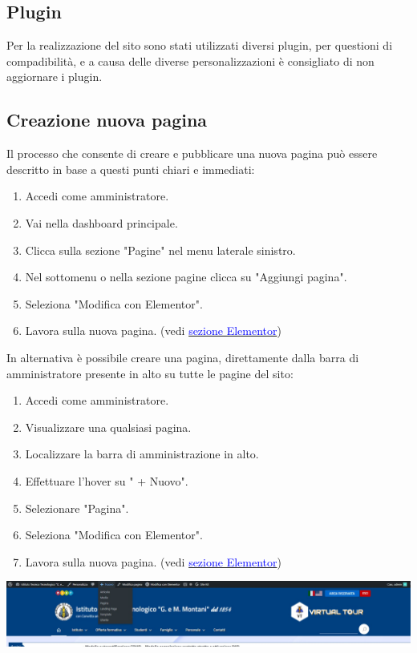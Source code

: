 \documentclass{article}
\begin{document}
	\subsection{\textbf{Plugin}}
	Per la realizzazione del sito sono stati utilizzati diversi plugin, per questioni di compadibilità, e a causa delle diverse personalizzazioni è consigliato di non aggiornare i plugin.

	\subsection{\textbf{Creazione nuova pagina}}

	Il processo che consente di creare e pubblicare una nuova pagina può essere descritto in base a questi punti chiari e immediati:
	
	\begin{enumerate}
		\item Accedi come amministratore.
		\item Vai nella dashboard principale.
		\item Clicca sulla sezione "Pagine" nel menu laterale sinistro.
		\item Nel sottomenu o nella sezione pagine clicca su "Aggiungi pagina".
		\item Seleziona "Modifica con Elementor".
		\item Lavora sulla nuova pagina. (vedi \hyperref[sec:Elementor]{\textcolor{blue}{sezione Elementor}})
	\end{enumerate}
	In alternativa è possibile creare una pagina, direttamente dalla barra di amministratore presente in alto su tutte le pagine del sito:
	\begin{enumerate}
		\item Accedi come amministratore.
		\item Visualizzare una qualsiasi pagina.
		\item Localizzare la barra di amministrazione in alto.
		\item Effettuare l'hover su " + Nuovo".
		\item Selezionare "Pagina".
		\item Seleziona "Modifica con Elementor".
		\item Lavora sulla nuova pagina. (vedi \hyperref[sec:Elementor]{\textcolor{blue}{sezione Elementor}})
	\end{enumerate}

	\includegraphics[scale=0.19]{+ Nuovo.jpeg}
\end{document}
